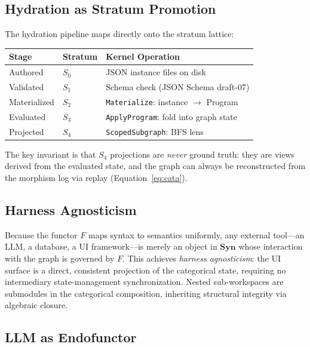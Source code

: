 \documentclass[submission,copyright,creativecommons]{eptcs}
\begin{document}


\subsection{Hydration as Stratum Promotion}

The hydration pipeline maps directly onto the stratum lattice:

\begin{center}
\begin{tabular}{@{}lll@{}}
\toprule
Stage & Stratum & Kernel Operation \\
\midrule
Authored   & $S_0$ & JSON instance files on disk \\
Validated  & $S_1$ & Schema check (JSON Schema draft-07) \\
Materialized & $S_2$ & \texttt{Materialize}: instance $\to$ Program \\
Evaluated  & $S_3$ & \texttt{ApplyProgram}: fold into graph state \\
Projected  & $S_4$ & \texttt{ScopedSubgraph}: BFS lens \\
\bottomrule
\end{tabular}
\end{center}

The key invariant is that $S_4$ projections are \emph{never} ground truth:
they are views derived from the evaluated state, and the graph can always be
reconstructed from the morphism log via replay (Equation~\ref{eq:cata}).

\subsection{Harness Agnosticism}

Because the functor $F$ maps syntax to semantics uniformly, any external
tool---an LLM, a database, a UI framework---is merely an object in
$\mathbf{Syn}$ whose interaction with the graph is governed by $F$. This
achieves \emph{harness agnosticism}: the UI surface is a direct, consistent
projection of the categorical state, requiring no intermediary state-management
synchronization. Nested sub-workspaces are submodules in the categorical
composition, inheriting structural integrity via algebraic closure.



\subsection{LLM as Endofunctor}
\label{subsec:llm-endofunctor}
\end{document}

